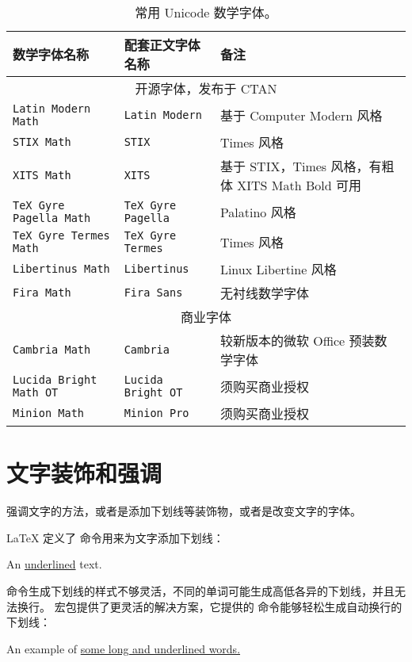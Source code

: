 \begin{table}[htp]
\centering\small
\caption{常用 Unicode 数学字体。}
\label{tbl:uni-math-fonts}
\begin{tabular}{llp{20em}}
\hline
\textbf{数学字体名称} & \textbf{配套正文字体名称} & \textbf{备注}\\
\hline
\multicolumn{3}{c}{开源字体，发布于 CTAN} \\
\hline
\texttt{Latin Modern Math}       & \texttt{Latin Modern}         & 基于 Computer Modern 风格 \\
\texttt{STIX Math}               & \texttt{STIX}                 & Times 风格 \\
\texttt{XITS Math}               & \texttt{XITS}                 & 基于 STIX，Times 风格，有粗体 XITS Math Bold 可用 \\
\texttt{TeX Gyre Pagella Math}   & \texttt{TeX Gyre Pagella}     & Palatino 风格 \\
\texttt{TeX Gyre Termes Math}    & \texttt{TeX Gyre Termes}      & Times 风格 \\
\texttt{Libertinus Math}         & \texttt{Libertinus}           & Linux Libertine 风格 \\
\texttt{Fira Math}               & \texttt{Fira Sans}            & 无衬线数学字体 \\
\hline
\multicolumn{3}{c}{商业字体} \\
\hline
\texttt{Cambria Math}            & \texttt{Cambria}              & 较新版本的微软 Office 预装数学字体 \\
\texttt{Lucida Bright Math OT}   & \texttt{Lucida Bright OT}     & 须购买商业授权 \\
\texttt{Minion Math}             & \texttt{Minion Pro}           & 须购买商业授权 \\
\hline
\end{tabular}
\end{table}

\section{文字装饰和强调}\label{sec:emphasize}

强调文字的方法，或者是添加下划线等装饰物，或者是改变文字的字体。

\LaTeX{} 定义了  命令用来为文字添加下划线：
\begin{example}
An \underline{underlined} text.
\end{example}

 命令生成下划线的样式不够灵活，不同的单词可能生成高低各异的下划线，并且无法换行。
 宏包提供了更灵活的解决方案，它提供的  命令能够轻松生成自动换行的下划线：
\begin{example}
An example of \uline{some
long and underlined words.}
\end{example}

